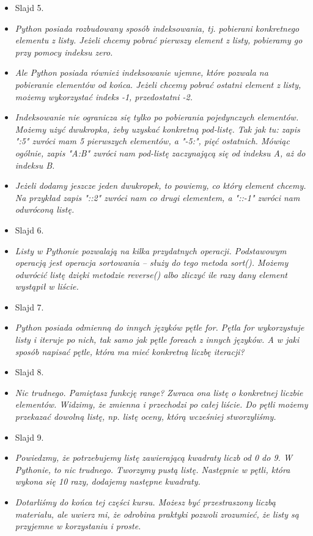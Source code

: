 \documentclass{mwart}
\begin{document}
\begin{itemize}
{      służy metoda extend. Jak się domyślasz, metod pop jest odpowiedzialna za usuwanie
      elementów z listy.}
  \item Slajd 5.
  \item \emph{Python posiada rozbudowany sposób indeksowania, tj. pobierani konkretnego
      elementu z listy. Jeżeli chcemy pobrać pierwszy element z listy, pobieramy go przy
      pomocy indeksu zero. }
  \item \emph{Ale Python posiada również indeksowanie ujemne, które pozwala na
      pobieranie elementów od końca. Jeżeli chcemy pobrać ostatni element z listy,
      możemy wykorzystać indeks -1, przedostatni -2.}
  \item \emph{Indeksowanie nie ogranicza się tylko po pobierania pojedynczych elementów.
      Możemy użyć dwukropka, żeby uzyskać konkretną pod-listę. Tak jak tu: zapis ":5"
      zwróci mam 5 pierwszych elementów, a "-5:", pięć ostatnich. Mówiąc ogólnie, zapis
      "A:B" zwróci nam pod-listę zaczynającą się od indeksu A, aż do indeksu B.}
  \item \emph{Jeżeli dodamy jeszcze jeden dwukropek, to powiemy, co który element
      chcemy. Na przykład zapis "::2" zwróci nam co drugi elementem, a "::-1" zwróci nam
      odwróconą listę.}
  \item Slajd 6.
  \item \emph{Listy w Pythonie pozwalają na kilka przydatnych operacji. Podstawowym operacją
      jest operacja sortowania -- służy do tego metoda sort(). Możemy odwrócić listę
      dzięki metodzie reverse() albo zliczyć ile razy dany element wystąpił w liście.}
  \item Slajd 7.
  \item \emph{Python posiada odmienną do innych języków pętle for. Pętla for
      wykorzystuje listy i iteruje po nich, tak samo jak pętle foreach z innych
      języków. A w jaki sposób napisać pętle, która ma mieć konkretną liczbę iteracji?}
  \item Slajd 8.
  \item \emph{Nic trudnego. Pamiętasz funkcję range? Zwraca ona listę o konkretnej
      liczbie elementów. Widzimy, że zmienna i przechodzi po całej liście. Do pętli
      możemy przekazać dowolną listę, np. listę oceny, którą wcześniej stworzyliśmy.}
  \item Slajd 9.
  \item \emph{Powiedzmy, że potrzebujemy listę zawierającą kwadraty liczb od 0 do 9. W
      Pythonie, to nic trudnego. Tworzymy pustą listę. Następnie w pętli, która wykona
      się 10 razy, dodajemy następne kwadraty. }
  \item \emph{Dotarliśmy do końca tej części kursu. Możesz być przestraszony liczbą
      materiału, ale uwierz mi, że odrobina praktyki pozwoli zrozumieć, że listy są
      przyjemne w korzystaniu i proste.}
\end{itemize}
\end{document}
